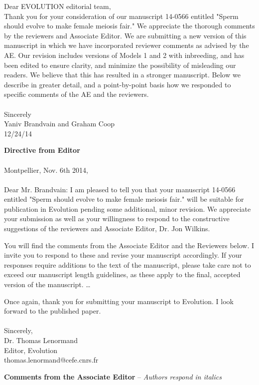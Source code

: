 \documentclass[12pt,letterpaper]{article}
\begin{document}
Dear EVOLUTION editorial team,
\\

Thank you for your consideration of our manuscript 14-0566 entitled "Sperm should evolve to make female meiosis fair." We appreciate the thorough comments by the reviewers and Associate Editor. We are submitting a new version of this manuscript in which we have incorporated reviewer comments as advised by the AE. Our revision includes versions of Models 1 and 2 with inbreeding, and has been edited to ensure clarity, and minimize the possibility of misleading our readers. We believe that this has resulted in a stronger manuscript. Below we describe in greater detail, and a point-by-point basis how we responded to specific comments of the AE and the reviewers.
\\
\\
Sincerely \\
Yaniv Brandvain and Graham Coop\\
12/24/14
\newpage


{\bf{Directive from Editor}} \\ \\
Montpellier, Nov. 6th 2014,
\\ \\
Dear Mr. Brandvain: 
I am pleased to tell you that your manuscript 14-0566 entitled "Sperm should evolve to make female meiosis fair." will be suitable for publication in Evolution pending some additional, minor revision. We appreciate your submission as well as your willingness to respond to the constructive suggestions of the reviewers and Associate Editor, Dr. Jon Wilkins.

You will find the comments from the Associate Editor and the Reviewers below. I invite you to respond to these and revise your manuscript accordingly. If your responses require additions to the text of the manuscript, please take care not to exceed our manuscript length guidelines, as these apply to the final, accepted version of the manuscript. \dots{}

Once again, thank you for submitting your manuscript to Evolution.  I look forward to the published paper.
\\  \\
Sincerely, \\
Dr. Thomas Lenormand \\
Editor, Evolution \\
thomas.lenormand@cefe.cnrs.fr

\newpage

{\bf{Comments from the Associate Editor}} -- \emph{Authors respond in italics}  \\ 
\end{document}
